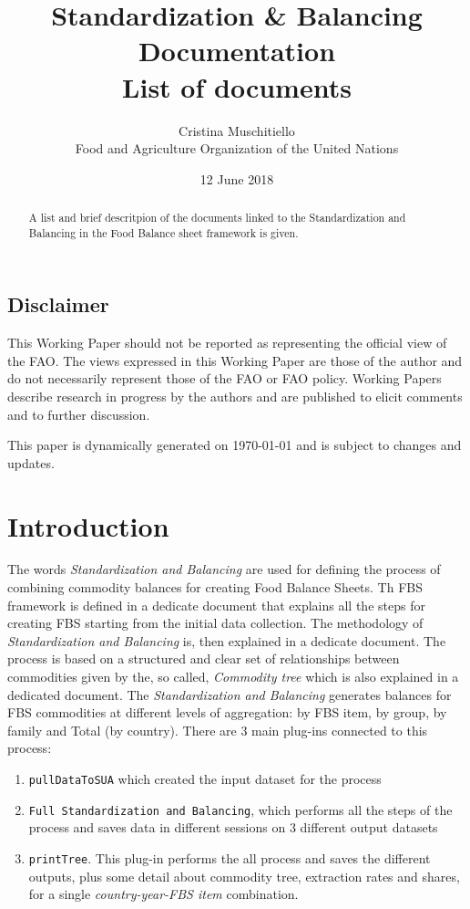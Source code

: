 \documentclass[]{article}
\title{Standardization \& Balancing Documentation\\
List of documents}
\author{Cristina Muschitiello\\
Food and Agriculture Organization of the United Nations}
\date{12 June 2018}
\providecommand{\tightlist}{%
  \setlength{\itemsep}{0pt}\setlength{\parskip}{0pt}}
\begin{document}
\maketitle
\begin{abstract}
A list and brief descritpion of the documents linked to the
Standardization and Balancing in the Food Balance sheet framework is
given.
\end{abstract}

\subsection*{Disclaimer}\label{disclaimer}

This Working Paper should not be reported as representing the official
view of the FAO. The views expressed in this Working Paper are those of
the author and do not necessarily represent those of the FAO or FAO
policy. Working Papers describe research in progress by the authors and
are published to elicit comments and to further discussion.

This paper is dynamically generated on \today{} and is subject to
changes and updates.

\section*{Introduction}\label{introduction}

The words \emph{Standardization and Balancing} are used for defining the
process of combining commodity balances for creating Food Balance
Sheets. Th FBS framework is defined in a dedicate document that explains
all the steps for creating FBS starting from the initial data
collection. The methodology of \emph{Standardization and Balancing} is,
then explained in a dedicate document. The process is based on a
structured and clear set of relationships between commodities given by
the, so called, \emph{Commodity tree} which is also explained in a
dedicated document. The \emph{Standardization and Balancing} generates
balances for FBS commodities at different levels of aggregation: by FBS
item, by group, by family and Total (by country). There are 3 main
plug-ins connected to this process:

\begin{enumerate}
\def\labelenumi{\arabic{enumi}.}
\tightlist
\item
  \texttt{pullDataToSUA} which created the input dataset for the process
\item
  \texttt{Full\ Standardization\ and\ Balancing}, which performs all the
  steps of the process and saves data in different sessions on 3
  different output datasets
\item
  \texttt{printTree}. This plug-in performs the all process and saves
  the different outputs, plus some detail about commodity tree,
  extraction rates and shares, for a single \emph{country-year-FBS item}
  combination.
\end{enumerate}
\end{document}
